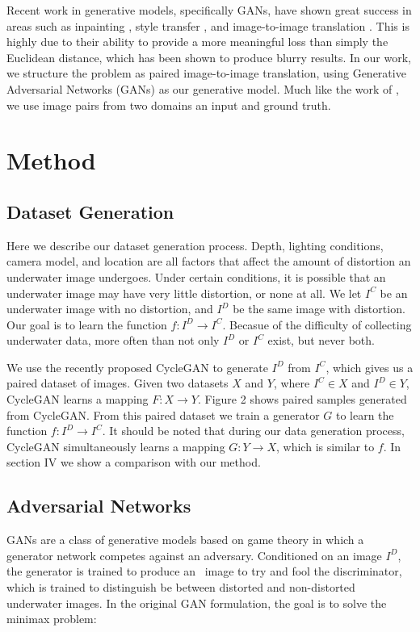 \documentclass[letterpaper, 10pt, conference]{ieeeconf}
\begin{document}
Recent work in generative models, specifically GANs, have shown great success
in areas such as inpainting \cite{pathak2016context}, style transfer \cite{Gatys_2016_CVPR}, and image-to-image
translation \cite{isola2016image,zhu2017unpaired}. This is highly due to their ability to provide a more meaningful
loss than simply the Euclidean distance, which has been shown to produce blurry results. In our work, we structure
the problem as paired image-to-image translation, using Generative Adversarial Networks (GANs) as our generative model.
Much like the work of \cite{isola2016image}, we use image pairs from two domains an input and ground truth.

\section{Method}

\subsection{Dataset Generation}
Here we describe our dataset generation process. Depth, lighting conditions, camera
model, and location are all factors that affect the amount of distortion an underwater image undergoes. Under certain
conditions, it is possible that an underwater image may have very little distortion, or none at all.
We let $I^C$ be an underwater image with no distortion, and $I^D$
be the same image with distortion. Our goal is to learn the function $f: I^D \rightarrow I^C$. Becasue of the
difficulty of collecting underwater data, more often than not only $I^D$ or $I^C$ exist, but never both.

We use the recently proposed CycleGAN \cite{zhu2017unpaired} to generate $I^D$ from $I^C$, which gives us a paired
dataset of images. Given two datasets $X$ and $Y$, where $I^C \in X$ and $I^D \in Y$, CycleGAN learns a mapping
$F: X \rightarrow Y$. Figure 2 shows paired samples generated from CycleGAN. From this paired dataset we train a
generator $G$ to learn the function $f: I^D \rightarrow I^C$. It should be noted that during our data generation process,
CycleGAN simultaneously learns a mapping $G: Y \rightarrow X$, which is similar to $f$. In section IV we show a comparison with our method.

\subsection{Adversarial Networks}
GANs \cite{goodfellow2014generative} are a class of generative models based on game theory in which a generator
network competes against an adversary. Conditioned on an image $I^D$, the generator is trained to produce an \
image to try and fool the discriminator, which is trained to distinguish be between distorted and non-distorted
underwater images. In the original GAN formulation, the goal is to solve the minimax problem: \newline
\end{document}
